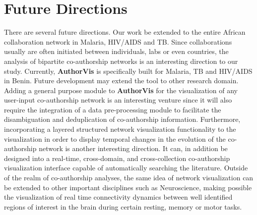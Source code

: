 \section*{Future Directions}
There are several future directions. Our work be extended to the entire African collaboration network in Malaria, HIV/AIDS and TB. Since collaborations usually are often initiated between individuals, labs or even countries, the analysis of bipartite co-authorship networks is an interesting direction to our study.
Currently, \textbf{AuthorVis} is specifically built for Malaria, TB and HIV/AIDS in Benin. Future development may extend the tool to other research domain. Adding a general purpose module to \textbf{AuthorVis} for the visualization of any user-input co-authorship network is an interesting venture since it will also require the integration of a data pre-processing module to facilitate the disambiguation and deduplication of co-authorship information. Furthermore, incorporating a layered structured network visualization \cite{nakazono_nel_2006} functionality to the visualization in order to display temporal changes in the evolution of the co-authorship network is another interesting direction. It can, in addition be designed into a real-time, cross-domain, and cross-collection co-authorship visualization interface capable of automatically searching the literature. 
Outside of the realm of co-authorship analyses, the same idea of network visualization can be extended to other important disciplines such as Neuroscience, making possible the visualization of real time connectivity dynamics between well identified regions of interest in the brain during certain resting, memory or motor tasks. %

